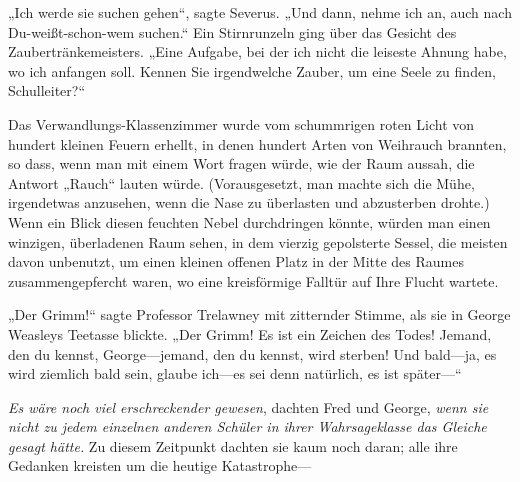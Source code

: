 „Ich werde sie suchen gehen“, sagte Severus. „Und dann, nehme ich an, auch nach Du-weißt-schon-wem suchen.“
Ein Stirnrunzeln ging über das Gesicht des Zaubertränkemeisters.
„Eine Aufgabe, bei der ich nicht die leiseste Ahnung habe, wo ich anfangen soll. Kennen Sie irgendwelche Zauber, um eine Seele zu finden, Schulleiter?“

\later

Das Verwandlungs-Klassenzimmer wurde vom schummrigen roten Licht von hundert kleinen Feuern erhellt, in denen hundert Arten von Weihrauch brannten, so dass, wenn man mit einem Wort fragen würde, wie der Raum aussah, die Antwort „Rauch“ lauten würde.
(Vorausgesetzt, man machte sich die Mühe, irgendetwas anzusehen, wenn die Nase zu überlasten und abzusterben drohte.)
Wenn ein Blick diesen feuchten Nebel durchdringen könnte, würden man einen winzigen, überladenen Raum sehen, in dem vierzig gepolsterte Sessel, die meisten davon unbenutzt, um einen kleinen offenen Platz in der Mitte des Raumes zusammengepfercht waren, wo eine kreisförmige Falltür auf Ihre Flucht wartete.

„Der Grimm!“ sagte Professor Trelawney mit zitternder Stimme, als sie in George Weasleys Teetasse blickte. „Der Grimm! Es ist ein Zeichen des Todes! Jemand, den du kennst, George—jemand, den du kennst, wird sterben! Und bald—ja, es wird ziemlich bald sein, glaube ich—es sei denn natürlich, es ist später—“

\emph{Es wäre noch viel erschreckender gewesen}, dachten Fred und George, \emph{wenn sie nicht zu jedem einzelnen anderen Schüler in ihrer Wahrsageklasse das Gleiche gesagt hätte.}
Zu diesem Zeitpunkt dachten sie kaum noch daran; alle ihre Gedanken kreisten um die heutige Katastrophe—

